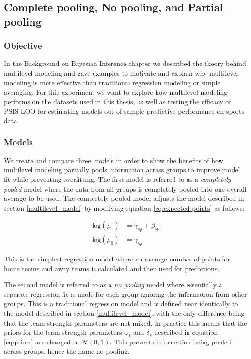\subsection{Complete pooling, No pooling, and Partial pooling} \label{experiment_1}

\subsubsection*{Objective}

In the Background on Bayesian Inference chapter we described the theory behind multilevel modeling and gave examples to motivate and explain why multilevel modeling is more effective than traditional regression modeling or simple averaging. For this experiment we want to explore how multilevel modeling performs on the datasets used in this thesis, as well as testing the efficacy of PSIS-LOO for estimating models out-of-sample predictive performance on sports data.

\subsubsection*{Models}

We create and compare three models in order to show the benefits of how multilevel modeling partially pools information across groups to improve model fit while preventing overfitting. The first model is referred to as a \textit{completely pooled} model where the data from all groups is completely pooled into one overall average to be used. The completely pooled model adjusts the model described in section \ref{multilevel_model} by modifying equation \ref{eq:expected points} as follows:

\begin{equation} \label{eq:cp_model}
\begin{split}
\text{log}(\mu_{1}) &= \gamma_{sp} + \beta_{sp} \\
\text{log}(\mu_{0}) &= \gamma_{sp}
\end{split}
\end{equation}

This is the simplest regression model where an average number of points for home teams and away teams is calculated and then used for predictions.

The second model is referred to as a \textit{no pooling} model where essentially a separate regression fit is made for each group ignoring the information from other groups. This is a traditional regression model and is defined near identically to the model described in section \ref{multilevel_model}, with the only difference being that the team strength parameters are not mixed. In practice this means that the priors for the team strength parameters $\omega_s$ and $\delta_s$ described in equation \ref{eq:priors} are changed to $\mathcal{N}(0, 1)$. This prevents information being pooled across groups, hence the name no pooling.

